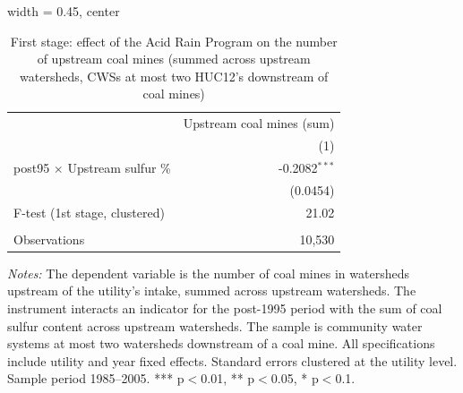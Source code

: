 
\begin{table}[htbp]
   
   \caption{\label{tab:fs_dwnstrm2step_minevio_ivsum} First stage: effect of the Acid Rain Program on the number of upstream coal mines (summed across upstream watersheds, CWSs at most two HUC12's downstream of coal mines)}
   \bigskip
   
   \centering
   
   \begin{adjustbox}{width = 0.45\textwidth, center}
      
      
      \begin{tabular}{lr}
         \toprule
         
                                              & Upstream coal mines (sum)\\  
         
                                              & (1)\\  
         
         \midrule 
         post95 $\times$ Upstream sulfur \%   & -0.2082$^{***}$\\   
                                              & (0.0454)\\   
         
         F-test (1st stage, clustered)        & 21.02\\  
         
          \\
         
         Observations                         & 10,530\\  
         
         \bottomrule
         
      \end{tabular}
      
      
      
   \end{adjustbox}
      {\tiny\linespread{1}\selectfont \par \raggedright 
   \textit{Notes:} The dependent variable is the number of coal mines in watersheds upstream of the utility's intake, summed across upstream watersheds. The instrument interacts an indicator for the post-1995 period with the sum of coal sulfur content across upstream watersheds. The sample is community water systems at most two watersheds downstream of a coal mine. All specifications include utility and year fixed effects. Standard errors clustered at the utility level. Sample period 1985--2005. *** p$<$0.01, ** p$<$0.05, * p$<$0.1.}
   
\end{table}


